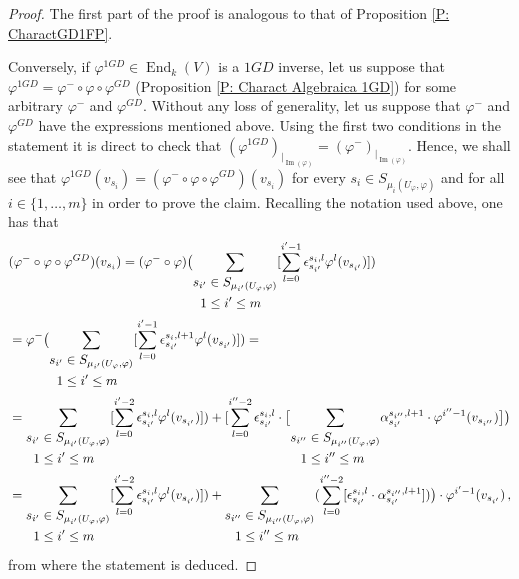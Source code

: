 \documentclass[10pt,a4paper]{amsart}
\theoremstyle{plain}
\theoremstyle{remark}
\numberwithin{equation}{section} \numberwithin{defn}{section}
\newcommand\ed{\operatorname{End}}
\newcommand{\Img}{\operatorname{Im}}
\newcommand{\f}{\varphi}
\begin{document}
\begin{proof}
The first part of the proof is analogous to that of Proposition \ref{P: CharactGD1FP}.

Conversely, if $\f^{1GD}\in \ed_k(V)$ is a $1GD$ inverse, let us suppose that $\f^{1GD}=\f^{-}\circ \f \circ \f^{GD}$ (Proposition \ref{P: Charact Algebraica 1GD}) for some arbitrary $\f^{-}$ and $\f^{GD}.$ Without any loss of generality, let us suppose that $\f^-$ and $\f^{GD}$ have the expressions mentioned above. Using the first two conditions in the statement it is direct to check that $(\f^{1GD})_{\vert_{\Img(\f)}}=(\f^{-})_{\vert_{\Img(\f)}}.$ Hence, we shall see that $\f^{1GD}(v_{s_i})=(\f^{-}\circ \f \circ \f^{GD})(v_{s_i})$ for every $s_i\in S_{{\mu}_i (U_\varphi, \varphi)}$ and for all $i\in \{1,\dots,m\}$ in order to prove the claim. Recalling the notation used above, one has that $$\begin{aligned} &(\f^{-}\circ \f \circ \f^{GD})(v_{s_i}) =  (\f^{-}\circ \f) \big (\underset {\begin{aligned} s_{i'} &\in S_{{\mu}_{i'} (U_\varphi, \varphi)} \\ 1 &\leq i' \leq m \end{aligned}} \sum [\sum_{l=0}^{i'-1} \epsilon_{s_{i'}}^{s_i,l} \varphi^{l} ({{v_{s_{i'}}}})])  \\ &=  \f^{-} \big (\underset {\begin{aligned} s_{i'} &\in S_{{\mu}_{i'} (U_\varphi, \varphi)} \\ 1 &\leq i' \leq m \end{aligned}} \sum [\sum_{l=0}^{i'-1} \epsilon_{s_{i'}}^{s_i,l+1} \varphi^{l} ({{v_{s_{i'}}}})])= \\ &= \underset {\begin{aligned} s_{i'} &\in S_{{\mu}_{i'} (U_\varphi, \varphi)} \\ 1 &\leq i' \leq m \end{aligned}} \sum [\sum_{l=0}^{i'-2} \epsilon_{s_{i'}}^{s_i,l} \varphi^{l} ({{v_{s_{i'}}}})]) + [\sum_{l=0}^{i''-2} \epsilon_{s_{i'}}^{s_i,l} \cdot \big [\underset {\begin{aligned} s_{i''} &\in S_{{\mu}_{i''} (U_\varphi, \varphi)} \\ 1 &\leq i'' \leq m \end{aligned}} \sum \alpha_{s_{i'}}^{s_{i''},l+1}\cdot \varphi^{i''-1} ({ {v_{s_{i''}}}})\big ]  \big )  \smallskip\\ &= \underset {\begin{aligned} s_{i'} &\in S_{{\mu}_{i'} (U_\varphi, \varphi)} \\ 1 &\leq i' \leq m \end{aligned}} \sum [\sum_{l=0}^{i'-2} \epsilon_{s_{i'}}^{s_i,l} \varphi^{l} ({{v_{s_{i'}}}})]) +  \underset {\begin{aligned} s_{i''} &\in S_{{\mu}_{i''} (U_\varphi, \varphi)} \\ 1 &\leq i'' \leq m \end{aligned}} \sum {( \sum_{l=0}^{i''-2} [\epsilon_{s_{i'}}^{s_i,l} \cdot \alpha_{s_{i'}}^{s_{i''},l+1}] )}\big )\cdot \varphi^{i'-1} ({ {v_{s_{i'}}}})\, ,\end{aligned}$$\noindent from where the statement is deduced.



\end{proof}
\end{document}
